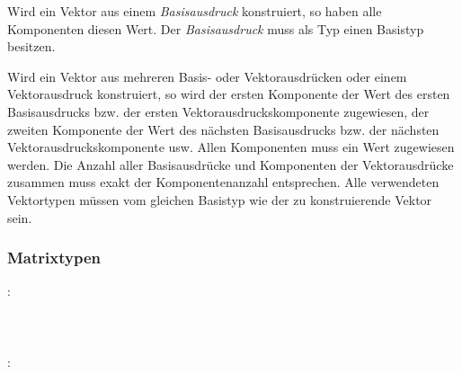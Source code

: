 Wird ein Vektor aus einem \emph{Basisausdruck} konstruiert, so haben alle Komponenten diesen Wert.
Der \emph{Basisausdruck} muss als Typ einen Basistyp besitzen.

Wird ein Vektor aus mehreren Basis- oder Vektorausdrücken oder einem Vektorausdruck konstruiert,
so wird der ersten Komponente der Wert des ersten Basisausdrucks bzw. der ersten Vektorausdruckskomponente zugewiesen,
der zweiten Komponente der Wert des nächsten Basisausdrucks bzw. der nächsten Vektorausdruckskomponente usw.
Allen Komponenten muss ein Wert zugewiesen werden. Die Anzahl aller Basisausdrücke und Komponenten der Vektorausdrücke
zusammen muss exakt der Komponentenanzahl entsprechen.
Alle verwendeten Vektortypen müssen vom gleichen Basistyp wie der zu konstruierende Vektor sein.


\subsubsection{Matrixtypen}\label{Matrixtypen}
:\label{typ_matrix}\\
\hspace*{1cm} \\
\hspace*{1cm} \\
\hspace*{1cm} \\
:\label{typ_matrix_float}\\
\hspace*{1cm}\glq{}\grq \\
\hspace*{1cm}\glq{}\grq \\
\hspace*{1cm}\glq{}\grq \\
\hspace*{1cm}\glq{}\grq \\
\hspace*{1cm}\glq{}\grq \\
\hspace*{1cm}\glq{}\grq \\
\hspace*{1cm}\glq{}\grq \\
\hspace*{1cm}\glq{}\grq \\
